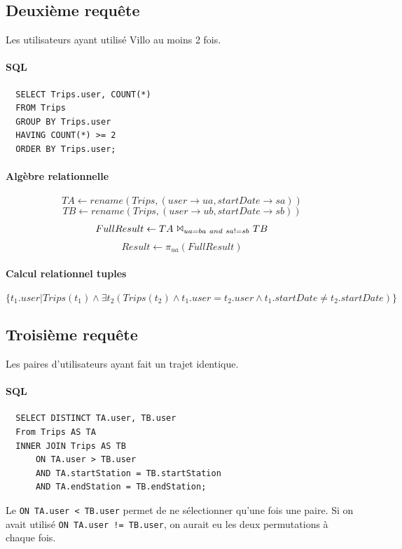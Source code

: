 \documentclass[a4paper]{article}
\begin{document}
\subsection{Deuxième requête}
    Les utilisateurs ayant utilisé Villo au moins 2 fois.

    \paragraph{SQL}
  \begin{verbatim}
  SELECT Trips.user, COUNT(*)
  FROM Trips
  GROUP BY Trips.user
  HAVING COUNT(*) >= 2
  ORDER BY Trips.user;
  \end{verbatim}
  
  \paragraph{Algèbre relationnelle}
  $$ TA \leftarrow rename(Trips, (user \rightarrow ua, startDate \rightarrow sa)) $$
  $$ TB \leftarrow rename(Trips, (user \rightarrow ub, startDate \rightarrow sb)) $$
  $$FullResult \leftarrow TA\ \Bowtie_{ua=ba\ and\ sa!=sb}\ TB $$
  $$Result \leftarrow \pi_{ua}(FullResult)$$
  
  \paragraph{Calcul relationnel tuples}
  $$ \{ t_1.user | Trips(t_1) \land \exists t_2 (Trips(t_2) \land t_1.user = t_2.user \land t_1.startDate \neq t_2.startDate)\} $$
  


\subsection{Troisième requête}
    Les paires d'utilisateurs ayant fait un trajet identique.

    \paragraph{SQL}
  \begin{verbatim}
  SELECT DISTINCT TA.user, TB.user
  From Trips AS TA
  INNER JOIN Trips AS TB 
      ON TA.user > TB.user 
      AND TA.startStation = TB.startStation 
      AND TA.endStation = TB.endStation;
  \end{verbatim}
    Le \texttt{ON TA.user < TB.user} permet de ne sélectionner qu'une fois une paire. Si on avait utilisé \texttt{ON TA.user != TB.user}, on aurait eu les deux permutations à chaque fois.
    
\end{document}
